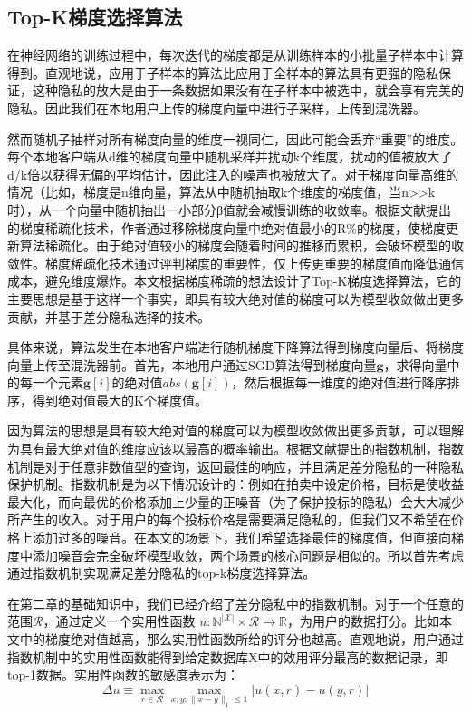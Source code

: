 \newpage

\subsection{Top-K梯度选择算法}
在神经网络的训练过程中，每次迭代的梯度都是从训练样本的小批量子样本中计算得到。直观地说，应用于子样本的算法比应用于全样本的算法具有更强的隐私保证，这种隐私的放大是由于一条数据如果没有在子样本中被选中，就会享有完美的隐私。因此我们在本地用户上传的梯度向量中进行子采样，上传到混洗器。

然而随机子抽样对所有梯度向量的维度一视同仁，因此可能会丢弃“重要”的维度。每个本地客户端从d维的梯度向量中随机采样并扰动k个维度，扰动的值被放大了d/k倍以获得无偏的平均估计，因此注入的噪声也被放大了。对于梯度向量高维的情况（比如，梯度是n维向量，算法从中随机抽取k个维度的梯度值，当n>>k时），从一个向量中随机抽出一小部分β值就会减慢训练的收敛率。根据文献提出的梯度稀疏化技术，作者通过移除梯度向量中绝对值最小的R\%的梯度，使梯度更新算法稀疏化。由于绝对值较小的梯度会随着时间的推移而累积，会破坏模型的收敛性。梯度稀疏化技术通过评判梯度的重要性，仅上传更重要的梯度值而降低通信成本，避免维度爆炸。本文根据梯度稀疏的想法设计了Top-K梯度选择算法，它的主要思想是基于这样一个事实，即具有较大绝对值的梯度可以为模型收敛做出更多贡献，并基于差分隐私选择的技术。

具体来说，算法发生在本地客户端进行随机梯度下降算法得到梯度向量后、将梯度向量上传至混洗器前。首先，本地用户通过SGD算法得到梯度向量$\mathbf{g}$，求得向量中的每一个元素$\mathbf{g}[i]$的绝对值$a b s(\mathbf{g}[i])$，然后根据每一维度的绝对值进行降序排序，得到绝对值最大的K个梯度值。

因为算法的思想是具有较大绝对值的梯度可以为模型收敛做出更多贡献，可以理解为具有最大绝对值的维度应该以最高的概率输出。根据文献提出的指数机制，指数机制是对于任意非数值型的查询，返回最佳的响应，并且满足差分隐私的一种隐私保护机制。指数机制是为以下情况设计的：例如在拍卖中设定价格，目标是使收益最大化，而向最优的价格添加上少量的正噪音（为了保护投标的隐私）会大大减少所产生的收入。对于用户的每个投标价格是需要满足隐私的，但我们又不希望在价格上添加过多的噪音。在本文的场景下，我们希望选择最佳的梯度值，但直接向梯度中添加噪音会完全破坏模型收敛，两个场景的核心问题是相似的。所以首先考虑通过指数机制实现满足差分隐私的top-k梯度选择算法。

在第二章的基础知识中，我们已经介绍了差分隐私中的指数机制。对于一个任意的范围$\mathcal{R}$，通过定义一个实用性函数 $u: \mathbb{N}^{|\mathcal{X}|} \times \mathcal{R} \rightarrow \mathbb{R}$，为用户的数据打分。比如本文中的梯度绝对值越高，那么实用性函数所给的评分也越高。直观地说，用户通过指数机制中的实用性函数能得到给定数据库X中的效用评分最高的数据记录，即top-1数据。实用性函数的敏感度表示为：
$$
\Delta u \equiv \max _{r \in \mathcal{R}} \max _{x, y:\|x-y\|_{1} \leq 1}|u(x, r)-u(y, r)|
$$

